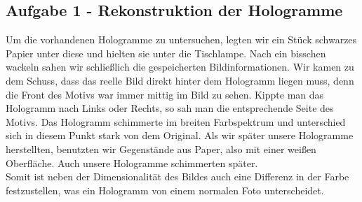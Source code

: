 \subsection*{Aufgabe 1 - Rekonstruktion der Hologramme}
Um die vorhandenen Hologramme zu untersuchen, legten wir ein Stück schwarzes Papier unter diese und hielten sie unter die Tischlampe. Nach ein bisschen wackeln sahen wir schließlich die gespeicherten Bildinformationen. Wir kamen zu dem Schuss, dass das reelle Bild direkt hinter dem Hologramm liegen muss, denn die Front des Motivs war immer mittig im Bild zu sehen. Kippte man das Hologramm nach Links oder Rechts, so sah man die entsprechende Seite des Motivs. Das Hologramm schimmerte im breiten Farbspektrum und unterschied sich in diesem Punkt stark von dem Original. Als wir später unsere Hologramme herstellten, benutzten wir Gegenstände aus Paper, also mit einer weißen Oberfläche. Auch unsere Hologramme schimmerten später.\\
Somit ist neben der Dimensionalität des Bildes auch eine Differenz in der Farbe festzustellen, was ein Hologramm von einem normalen Foto unterscheidet.